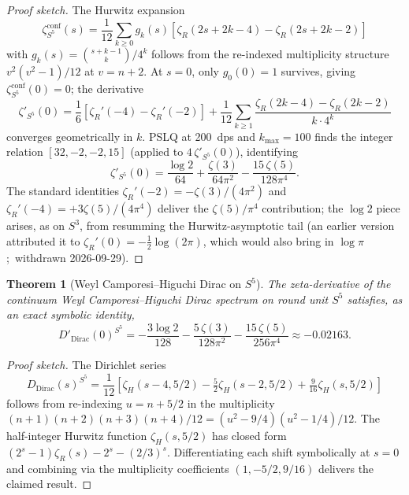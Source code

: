 \documentclass[11pt,a4paper]{article}
\theoremstyle{plain}
\newtheorem{theorem}{Theorem}[section]
\theoremstyle{definition}
\newcommand{\sthree}{S^{3}}
\begin{document}
\begin{proof}[Proof sketch]
The Hurwitz expansion
\begin{equation}
\zeta_{S^{5}}^\text{conf}(s) = \frac{1}{12}\sum_{k \ge 0} g_{k}(s) [\zeta_{R}(2s + 2k - 4) - \zeta_{R}(2s + 2k - 2)]
\end{equation}
with $g_{k}(s) = \binom{s + k - 1}{k}/4^{k}$ follows from the
re-indexed multiplicity structure $v^{2}(v^{2} - 1)/12$ at $v = n + 2$.
At $s = 0$, only $g_{0}(0) = 1$ survives, giving
$\zeta_{S^{5}}^\text{conf}(0) = 0$; the derivative
\begin{equation}
\zeta'_{S^{5}}(0) = \frac{1}{6}[\zeta_{R}'(-4) - \zeta_{R}'(-2)]
+ \frac{1}{12}\sum_{k \ge 1} \frac{\zeta_{R}(2k - 4) - \zeta_{R}(2k - 2)}{k \cdot 4^{k}}
\end{equation}
converges geometrically in $k$. PSLQ at 200~dps and $k_{\max} = 100$
finds the integer relation $[32, -2, -2, 15]$ (applied to
$4\,\zeta'_{S^{5}}(0)$), identifying
\begin{equation}
\zeta'_{S^{5}}(0) = \frac{\log 2}{64} + \frac{\zeta(3)}{64\pi^{2}}
- \frac{15\,\zeta(5)}{128\pi^{4}}.
\end{equation}
The standard identities $\zeta_{R}'(-2) = -\zeta(3)/(4\pi^{2})$ and
$\zeta_{R}'(-4) = +3\zeta(5)/(4\pi^{4})$ deliver the $\zeta(5)/\pi^{4}$
contribution; the $\log 2$ piece arises, as on $\sthree$, from resumming
the Hurwitz-asymptotic tail (an earlier version attributed it to
$\zeta_{R}'(0) = -\tfrac{1}{2}\log(2\pi)$, which would also bring in
$\log\pi$;\ withdrawn 2026-09-29).
\end{proof}

\begin{theorem}[Weyl Camporesi--Higuchi Dirac on $S^{5}$]
\label{thm:dirac_S5}
The zeta-derivative of the continuum Weyl Camporesi--Higuchi Dirac
spectrum on round unit $S^{5}$ satisfies, as an exact symbolic identity,
\begin{equation}
D'_\text{Dirac}(0)^{S^{5}}
= -\frac{3\log 2}{128} - \frac{5\,\zeta(3)}{128\pi^{2}} - \frac{15\,\zeta(5)}{256\pi^{4}}
\approx -0.02163.
\label{eq:DD_S5}
\end{equation}
\end{theorem}

\begin{proof}[Proof sketch]
The Dirichlet series
\begin{equation}
D_\text{Dirac}(s)^{S^{5}} = \frac{1}{12} \left[\zeta_{H}(s - 4, 5/2) - \tfrac{5}{2}\zeta_{H}(s - 2, 5/2) + \tfrac{9}{16}\zeta_{H}(s, 5/2)\right]
\label{eq:DD_S5_closed}
\end{equation}
follows from re-indexing $u = n + 5/2$ in the multiplicity
$(n + 1)(n + 2)(n + 3)(n + 4)/12 = (u^{2} - 9/4)(u^{2} - 1/4)/12$. The
half-integer Hurwitz function $\zeta_{H}(s, 5/2)$ has closed form
$(2^{s} - 1)\zeta_{R}(s) - 2^{s} - (2/3)^{s}$. Differentiating each
shift symbolically at $s = 0$ and combining via the multiplicity
coefficients $(1, -5/2, 9/16)$ delivers the claimed result.
\end{proof}
\end{document}

